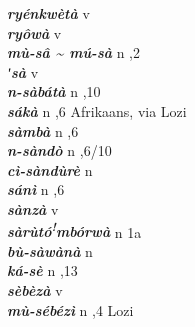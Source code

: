 \begin{multicols}{2}
{{\bfseries\itshape ryénkwètà}} \relax  v  \relax   \relax  {} \relax   \relax  \\
{{\bfseries\itshape ryôwà}} \relax  v  \relax   \relax  {} \relax   \relax  \\
{{\bfseries\itshape mù-sâ {\textasciitilde} mú-sà}} \relax  n  ,2  \relax   \relax  \\
{{\bfseries\itshape ʹsà}} \relax  v  \relax   \relax  {} \relax   \relax  \\
{{\bfseries\itshape n-sàbátà}} \relax  n  ,10  \relax   \relax  \\
{{\bfseries\itshape sákà}} \relax  n  ,6  \relax  Afrikaans, via Lozi \relax  \\
{{\bfseries\itshape sàmbà}} \relax  n  ,6  \relax   \relax  \\
{{\bfseries\itshape n-sàndò}} \relax  n  ,6/10  \relax   \relax  \\
{{\bfseries\itshape cì-sàndùrè}} \relax  n   \relax  {} \relax   \relax  \\
{{\bfseries\itshape sánì}} \relax  n  ,6  \relax  \\
{{\bfseries\itshape sànzà}} \relax  v  \relax   \relax  {} \relax   \relax  \\
{{\bfseries\itshape sàrùtó\textsuperscript{!}mbórwà}} \relax  n  \relax  1a \relax  {} \relax   \relax  \\
{{\bfseries\itshape bù-sàwànà}} \relax  n   \relax  {} \relax   \relax  \\
{{\bfseries\itshape ká-sè}} \relax  n  ,13  \relax   \relax  \\
{{\bfseries\itshape sèbèzà}} \relax  v  \relax   \relax  {} \relax   \relax  \\
{{\bfseries\itshape mù-sébézì}} \relax  n  ,4  \relax  Lozi \relax  \\

\end{multicols}

